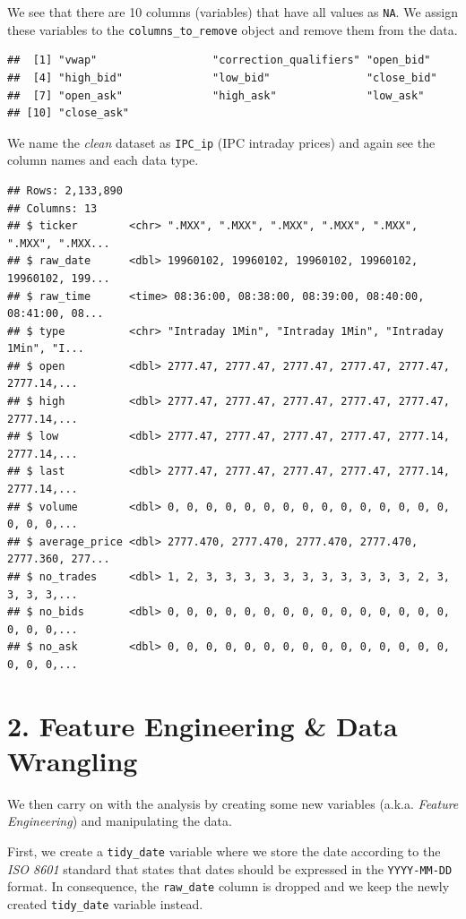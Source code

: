 \documentclass[]{elsarticle} %
\begin{document}
We see that there are 10 columns (variables) that have all values as
\texttt{NA}. We assign these variables to the
\texttt{columns\_to\_remove} object and remove them from the data.

\begin{verbatim}
##  [1] "vwap"                  "correction_qualifiers" "open_bid"             
##  [4] "high_bid"              "low_bid"               "close_bid"            
##  [7] "open_ask"              "high_ask"              "low_ask"              
## [10] "close_ask"
\end{verbatim}

We name the \emph{clean} dataset as \texttt{IPC\_ip} (IPC intraday
prices) and again see the column names and each data type.

\begin{verbatim}
## Rows: 2,133,890
## Columns: 13
## $ ticker        <chr> ".MXX", ".MXX", ".MXX", ".MXX", ".MXX", ".MXX", ".MXX...
## $ raw_date      <dbl> 19960102, 19960102, 19960102, 19960102, 19960102, 199...
## $ raw_time      <time> 08:36:00, 08:38:00, 08:39:00, 08:40:00, 08:41:00, 08...
## $ type          <chr> "Intraday 1Min", "Intraday 1Min", "Intraday 1Min", "I...
## $ open          <dbl> 2777.47, 2777.47, 2777.47, 2777.47, 2777.47, 2777.14,...
## $ high          <dbl> 2777.47, 2777.47, 2777.47, 2777.47, 2777.47, 2777.14,...
## $ low           <dbl> 2777.47, 2777.47, 2777.47, 2777.47, 2777.14, 2777.14,...
## $ last          <dbl> 2777.47, 2777.47, 2777.47, 2777.47, 2777.14, 2777.14,...
## $ volume        <dbl> 0, 0, 0, 0, 0, 0, 0, 0, 0, 0, 0, 0, 0, 0, 0, 0, 0, 0,...
## $ average_price <dbl> 2777.470, 2777.470, 2777.470, 2777.470, 2777.360, 277...
## $ no_trades     <dbl> 1, 2, 3, 3, 3, 3, 3, 3, 3, 3, 3, 3, 3, 2, 3, 3, 3, 3,...
## $ no_bids       <dbl> 0, 0, 0, 0, 0, 0, 0, 0, 0, 0, 0, 0, 0, 0, 0, 0, 0, 0,...
## $ no_ask        <dbl> 0, 0, 0, 0, 0, 0, 0, 0, 0, 0, 0, 0, 0, 0, 0, 0, 0, 0,...
\end{verbatim}

\hypertarget{feature-engineering-data-wrangling}{%
\section{2. Feature Engineering \& Data
Wrangling}\label{feature-engineering-data-wrangling}}

We then carry on with the analysis by creating some new variables
(a.k.a. \emph{Feature Engineering}) and manipulating the data.

First, we create a \texttt{tidy\_date} variable where we store the date
according to the \emph{ISO 8601} standard that states that dates should
be expressed in the \texttt{YYYY-MM-DD} format. In consequence, the
\texttt{raw\_date} column is dropped and we keep the newly created
\texttt{tidy\_date} variable instead.
\end{document}
